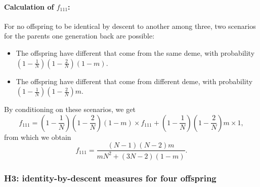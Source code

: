 \documentclass[11pt]{article}
\begin{document}
\paragraph{Calculation of $f_{111}$:}
For no offspring to be identical by descent to another among three, two scenarios for the parents one generation back are possible:
\begin{itemize}
\item The offspring have different that come from the same deme, with probability $\left(1-\frac{1}{N}\right)\left(1-\frac{2}{N}\right)(1-m)$. 
\item The offspring have different that come from different deme, with probability $\left(1-\frac{1}{N}\right)\left(1-\frac{2}{N}\right)m$.
\end{itemize}
By conditioning on these scenarios, we get
\begin{equation}
f_{111}=\left(1-\frac{1}{N}\right)\left(1-\frac{2}{N}\right)(1-m)\times f_{111}
+\left(1-\frac{1}{N}\right)\left(1-\frac{2}{N}\right)m\times1,
\end{equation}
from which we obtain
\begin{equation}
f_{111}=\frac{(N-1)(N-2)m}{mN^2+(3N-2)(1-m)}.
\end{equation}

\subsubsection*{H3: identity-by-descent measures for four offspring}
\end{document}
